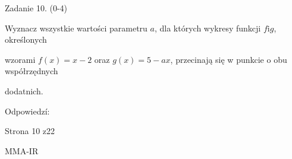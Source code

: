 \documentclass[a4paper,12pt]{article}
\begin{document}
Zadanie 10. (0-4)

Wyznacz wszystkie wartości parametru $a$, dla których wykresy funkcji $f\mathrm{i}g$, określonych

wzorami $f(x)=x-2$ oraz $g(x)=5-ax$, przecinają się w punkcie o obu współrzędnych

dodatnich.

Odpowiedzí:

Strona 10 z22

MMA-IR
\end{document}
